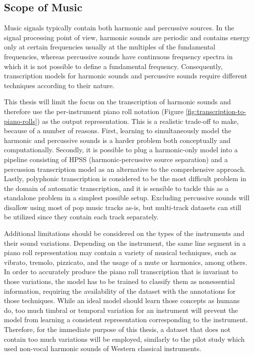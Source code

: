 \subsection{Scope of Music}

Music signals typically contain both harmonic and percussive sources. 
In the signal processing point of view, harmonic sounds are periodic and contains energy only at certain frequencies usually at the multiples of the fundamental frequencies, whereas percussive sounds have continuous frequency spectra in which it is not possible to define a fundamental frequency.
Consequently, transcription models for harmonic sounds and percussive sounds require different techniques according to their nature.


This thesis will limit the focus on the transcription of harmonic sounds and therefore use the per-instrument piano roll notation (Figure \ref{fig:transcription-to-piano-rolls}) as the output representation.
This is a realistic trade-off to make, because of a number of reasons.
First, learning to simultaneously model the harmonic and percussive sounds is a harder problem both conceptually and computationally.
Secondly, it is possible to plug a harmonic-only model into a pipeline consisting of HPSS (harmonic-percussive source separation) and a percussion transcription model as an alternative to the comprehensive approach.
Lastly, polyphonic transcription is considered to be the most difficult problem in the domain of automatic transcription, and it is sensible to tackle this as a standalone problem in a simplest possible setup.
Excluding percussive sounds will disallow using most of pop music tracks as-is, but multi-track datasets can still be utilized since they contain each track separately.


Additional limitations should be considered on the types of the instruments and their sound variations.
Depending on the instrument, the same line segment in a piano roll representation may contain a variety of musical techniques, such as vibrato, tremolo, pizzicato, and the usage of a mute or harmonics, among others.
In order to accurately produce the piano roll transcription that is invariant to those variations, the model has to be trained to classify them as nonessential information, requiring the availability of the dataset with the annotations for those techniques.
While an ideal model should learn those concepts as humans do, too much timbral or temporal variation for an instrument will prevent the model from learning a consistent representation corresponding to the instrument.
Therefore, for the immediate purpose of this thesis, a dataset that does not contain too much variations will be employed, similarly to the pilot study which used non-vocal harmonic sounds of Western classical instruments.


